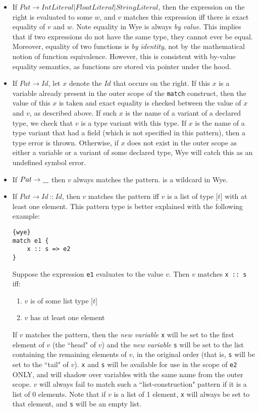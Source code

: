 \documentclass[a4paper, 12pt]{article}
\newcommand{\uscore}{\underline{\hspace{0.3cm}}}
\begin{document}
\begin{itemize}
\item If $Pat \to IntLiteral | FloatLiteral | StringLiteral$, then the expression on the right is evaluated to some $w$, and $v$ matches this expression iff there is exact equality of $v$ and $w$. Note equality in Wye is always \textit{by value}. This implies that if two expressions do not have the same type, they cannot ever be equal. Moreover, equality of two functions is \textit{by identity}, not by the mathematical notion of function equivalence. However, this is consistent with by-value equality semantics, as functions are stored via pointer under the hood.
\item If $Pat \to Id$, let $x$ denote the $Id$ that occurs on the right. If this $x$ is a variable already present in the outer scope of the \texttt{match} construct, then the value of this $x$ is taken and exact equality is checked between the value of $x$ and $v$, as described above. If such $x$ is the name of a variant of a declared type, we check that $v$ is a type variant with this type. If $x$ is the name of a type variant that had a field (which is not specified in this pattern), then a type error is thrown. Otherwise, if $x$ does not exist in the outer scope as either a variable or a variant of some declared type, Wye will catch this as an undefined symbol error.
\item If $Pat \to \uscore$ then $v$ always matches the pattern. \uscore{} is a wildcard in Wye.
\item If $Pat \to Id \:\texttt{::}\: Id$, then $v$ matches the pattern iff $v$ is a list of type $\texttt{[}t\texttt{]}$ with at least one element. This pattern type is better explained with the following example:
\begin{lstlisting}{wye}
match e1 {
	x :: s => e2
}
\end{lstlisting}
Suppose the expression \texttt{e1} evaluates to the value $v$. Then $v$ matches \texttt{x :: s} iff:
\begin{enumerate}
\item $v$ is of some list type $\texttt{[}t\texttt{]}$
\item $v$ has at least one element
\end{enumerate}
If $v$ matches the pattern, then the \textit{new variable} \texttt{x} will be set to the first element of $v$ (the ``head" of $v$) and the \textit{new variable} \texttt{s} will be set to the list containing the remaining elements of $v$, in the original order (that is, \texttt{s} will be set to the ``tail" of $v$). \texttt{x} and \texttt{s} will be available for use in the scope of \texttt{e2} ONLY, and will shadow over variables with the same name from the outer scope. $v$ will always fail to match such a ``list-construction" pattern if it is a list of 0 elements. Note that if $v$ is a list of 1 element, \texttt{x} will always be set to that element, and \texttt{s} will be an empty list.

\end{itemize}
\end{document}
